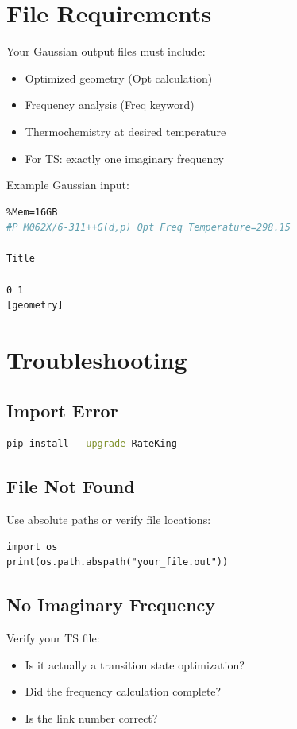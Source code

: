\documentclass[11pt,a4paper]{article}
\begin{document}
\section{File Requirements}

Your Gaussian output files must include:
\begin{itemize}
    \item Optimized geometry (Opt calculation)
    \item Frequency analysis (Freq keyword)
    \item Thermochemistry at desired temperature
    \item For TS: exactly one imaginary frequency
\end{itemize}

Example Gaussian input:
\begin{lstlisting}[language=bash, frame=single]
%NProcShared=8
%Mem=16GB
#P M062X/6-311++G(d,p) Opt Freq Temperature=298.15

Title

0 1
[geometry]

\end{lstlisting}

\section{Troubleshooting}

\subsection{Import Error}
\begin{lstlisting}[language=bash, frame=single]
pip install --upgrade RateKing
\end{lstlisting}

\subsection{File Not Found}
Use absolute paths or verify file locations:
\begin{lstlisting}
import os
print(os.path.abspath("your_file.out"))
\end{lstlisting}

\subsection{No Imaginary Frequency}
Verify your TS file:
\begin{itemize}
    \item Is it actually a transition state optimization?
    \item Did the frequency calculation complete?
    \item Is the link number correct?
\end{itemize}
\end{document}
